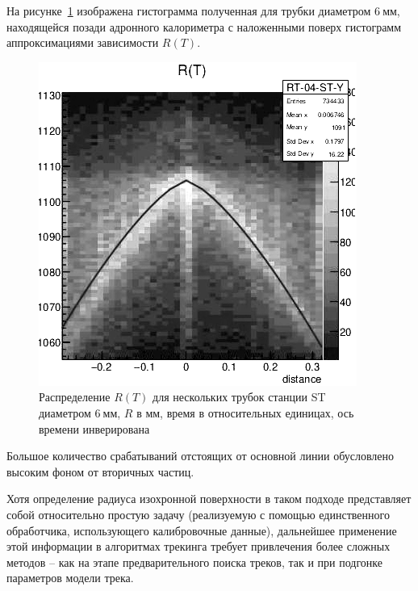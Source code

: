 На рисунке~\ref{fig:straws-rt} изображена гистограмма полученная для
трубки диаметром $6~\text{мм}$, находящейся
позади адронного калориметра с наложенными поверх гистограмм аппроксимациями
зависимости $R(T)$.
\begin{figure}
    \centering
    \includegraphics[width=0.33\linewidth]{images//illustrative/ST-RT-single-mono.png}
    \caption{Распределение $R(T)$ для нескольких трубок станции ST
    диаметром $6~\text{мм}$, $R$ в мм, время в относительных единицах, ось времени инверирована}
    \label{fig:straws-rt}
\end{figure}
Большое количество срабатываний отстоящих от основной линии обусловлено
высоким фоном от вторичных частиц.

Хотя определение радиуса изохронной поверхности в таком подходе
представляет собой относительно простую задачу (реализуемую с помощью
единственного обработчика, использующего калибровочные данные),
дальнейшее применение этой информации в алгоритмах трекинга требует
привлечения более сложных методов -- как на этапе предварительного
поиска треков, так и при подгонке параметров модели трека. 

